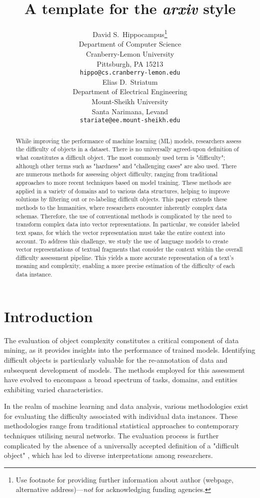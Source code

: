 \documentclass{article}
\title{A template for the \emph{arxiv} style}
\author{ David S.~Hippocampus\thanks{Use footnote for providing further
		information about author (webpage, alternative
		address)---\emph{not} for acknowledging funding agencies.} \\
	Department of Computer Science\\
	Cranberry-Lemon University\\
	Pittsburgh, PA 15213 \\
	\texttt{hippo@cs.cranberry-lemon.edu} \\
	\And
	Elias D.~Striatum \\
	Department of Electrical Engineering\\
	Mount-Sheikh University\\
	Santa Narimana, Levand \\
	\texttt{stariate@ee.mount-sheikh.edu} \\
}
\date{}
\begin{document}
\maketitle

\begin{abstract}
    While improving the performance of machine learning (ML) models, researchers assess the difficulty of objects in a dataset. There is no universally agreed-upon definition of what constitutes a difficult object. The most commonly used term is "difficulty"; although other terms such as "hardness" and "challenging cases" are also used. There are numerous methods for assessing object difficulty, ranging from traditional approaches to more recent techniques based on model training. These methods are applied in a variety of domains and to various data structures, helping to improve solutions by filtering out or re-labeling difficult objects. This paper extends these methods to the humanities, where researchers encounter inherently complex data schemas. Therefore, the use of conventional methods is complicated by the need to transform complex data into vector representations. In particular, we consider labeled text spans, for which the vector representation must take the entire context into account. To address this challenge, we study the use of language models to create vector representations of textual fragments that consider the context within the overall difficulty assessment pipeline. This yields a more accurate representation of a text's meaning and complexity, enabling a more precise estimation of the difficulty of each data instance.

\end{abstract}

\section{Introduction}
The evaluation of object complexity constitutes a critical component of data mining, as it provides insights into the performance of trained models. Identifying difficult objects is particularly valuable for the re-annotation of data and subsequent development of models. The methods employed for this assessment have evolved to encompass a broad spectrum of tasks, domains, and entities exhibiting varied characteristics.

In the realm of machine learning and data analysis, various methodologies exist for evaluating the difficulty associated with individual data instances. These methodologies range from traditional statistical approaches to contemporary techniques utilising neural networks. The evaluation process is further complicated by the absence of a universally accepted definition of a "difficult object" \cite{seedat2024dissecting}, which has led to diverse interpretations among researchers.
\end{document}

